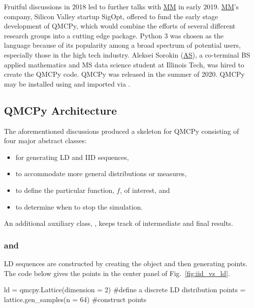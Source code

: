 \documentclass[11pt]{NSFamsart}
\newcommand{\MM}{\hyperlink{MMlink}{MM}\xspace}
\newcommand{\AS}{\hyperlink{ASlink}{AS}\xspace}
\begin{document}
Fruitful discussions in 2018 led to further talks with \MM in early 2019.  \MM's company, Silicon Valley startup SigOpt, offered to fund the early stage development of  QMCPy, which would combine the efforts of several different research groups into a cutting edge package. Python 3 was chosen as the language because of its popularity among a broad spectrum of potential users, especially those in the high tech industry.  \hypertarget{ASlink}{Aleksei Sorokin} (\AS),  a co-terminal BS applied mathematics and MS data science student at Illinois Tech, was hired to create the QMCPy code.  QMCPy was released in the summer of 2020.  QMCPy may be installed using  and imported via .




\subsection{QMCPy Architecture}

The aforementioned discussions produced a skeleton for QMCPy consisting of four major abstract classes:
\begin{itemize}
	\item {} for generating LD and IID sequences,
	\item {} to accommodate more general distributions or measures,
	\item {} to define the particular function, $f$, of interest, and
	\item {} to determine when to stop the simulation.
\end{itemize}
An additional auxiliary class, , keeps track of intermediate and final results.

\subsubsection{\textup{ and }} LD sequences are constructed by creating the object and then generating points.  The code below gives the points in the center panel of Fig.\ \ref{fig:iid_vs_ld}.
\begin{pythoncode}
ld = qmcpy.Lattice(dimension = 2)  #define a discrete LD distribution
points = lattice.gen_samples(n = 64)  #construct points
\end{pythoncode}
\end{document}
